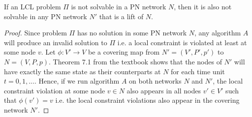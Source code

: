 \begin{lemma} \label{lem:lcl_unsolvability:from_multiple_to_lift}
If an LCL problem $\Pi$ is not solvable in a PN network $N$, then it is also not solvable in any PN network $N'$ that is a lift of $N$.
\end{lemma}
\begin{proof}
    Since problem $\Pi$ has no solution in some PN network $N$, any algorithm $A$ will produce an invalid solution to $\Pi$ i.e. a local constraint is violated at least at some node $v$.
    Let $\phi: V' \rightarrow V$ be a covering map from $N'=(V', P', p')$ to $N=(V, P, p)$.
    Theorem 7.1 from the textbook \cite{HirvonenSuomelaDistAlg2020} shows that the nodes of $N'$ will have exactly the same state as their counterparts at $N$ for each time unit $t=0,1,...$\;.
    Hence, if we run algorithm $A$ on both networks $N$ and $N'$, the local constraint violation at some node $v \in N$ also appears in all nodes $v' \in V'$ such that $\phi(v') = v$ i.e. the local constraint violations also appear in the covering network $N'$.
\end{proof}

